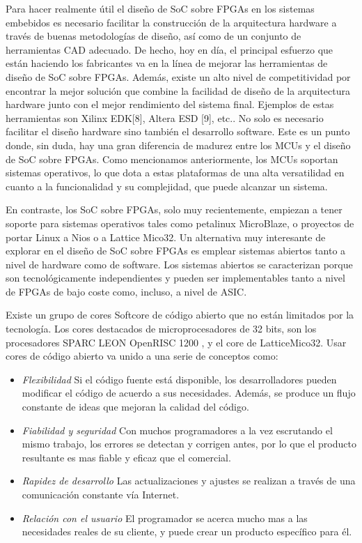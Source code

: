 Para hacer realmente útil el diseño de SoC sobre FPGAs en los sistemas embebidos es necesario facilitar la construcción de la arquitectura hardware a través de 
buenas metodologías de diseño, así como de un conjunto de herramientas CAD adecuado. De hecho, hoy en día, el principal esfuerzo que están haciendo los fabricantes 
va en la línea de mejorar las herramientas de diseño de SoC sobre FPGAs. Además, existe un alto nivel de competitividad por encontrar la mejor solución que combine la facilidad de diseño de la arquitectura hardware junto con el mejor rendimiento del sistema 
final. Ejemplos de estas herramientas son Xilinx EDK[8], Altera ESD [9], etc..
No solo es necesario facilitar el diseño hardware sino también el desarrollo software. Este es un punto donde, sin duda, hay una gran diferencia de madurez entre los 
MCUs y el diseño de SoC sobre FPGAs. Como mencionamos anteriormente, los MCUs soportan sistemas operativos, lo que dota a estas plataformas de 
una alta versatilidad en cuanto a la funcionalidad y su complejidad, que puede alcanzar un sistema. 

En contraste, los SoC sobre FPGAs, solo muy recientemente, empiezan a tener soporte para sistemas operativos  tales como petalinux MicroBlaze, o proyectos de portar Linux a Nios o a Lattice Mico32. 
Un alternativa muy interesante de explorar en el diseño de SoC sobre FPGAs es emplear sistemas abiertos tanto a nivel de hardware como de software. Los sistemas 
abiertos se caracterizan porque son tecnológicamente independientes y pueden ser implementables tanto a nivel de FPGAs de bajo coste como, incluso, a nivel de 
ASIC. 

Existe un grupo de cores Softcore de código abierto que no están limitados por la tecnología. Los cores destacados de microprocesadores de 32 bits,
son los procesadores SPARC LEON OpenRISC 1200 , y el core de LatticeMico32. Usar cores de código abierto va unido a una serie de conceptos como:
\begin {itemize}
\item
\textit{Flexibilidad}  Si el código fuente está disponible, los desarrolladores pueden modificar el código de acuerdo a sus necesidades. Además, se
produce un flujo constante de ideas que mejoran la calidad del código.
\item 
\textit{Fiabilidad y seguridad}  Con muchos programadores a la vez escrutando el mismo trabajo, los errores se detectan y corrigen antes, por lo que
el producto resultante es mas fiable y eficaz que el comercial.
\item 
\textit{Rapidez de desarrollo}  Las actualizaciones y ajustes se realizan a través de una comunicación constante vía Internet.
\item 
\textit{Relación con el usuario} El programador se acerca mucho mas a las necesidades reales de su cliente, y puede crear un producto específico para
él.
 \end {itemize}
 

